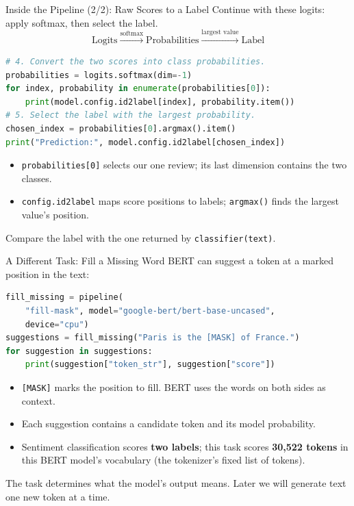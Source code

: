 \documentclass[aspectratio=169]{beamer}
\begin{document}
\begin{frame}[fragile]{Inside the Pipeline (2/2): Raw Scores to a Label}
  \small Continue with these logits: apply softmax, then select the label.
  \[
    \text{Logits}\xrightarrow{\text{softmax}}\text{Probabilities}
    \xrightarrow{\text{largest value}}\text{Label}
  \]
  \begin{lstlisting}[language=Python]
# 4. Convert the two scores into class probabilities.
probabilities = logits.softmax(dim=-1)
for index, probability in enumerate(probabilities[0]):
    print(model.config.id2label[index], probability.item())
# 5. Select the label with the largest probability.
chosen_index = probabilities[0].argmax().item()
print("Prediction:", model.config.id2label[chosen_index])
  \end{lstlisting}
  \begin{itemize}
    \item \texttt{probabilities[0]} selects our one review; its last dimension contains the two classes.
    \item \texttt{config.id2label} maps score positions to labels; \texttt{argmax()} finds the largest value's position.
  \end{itemize}
  \small Compare the label with the one returned by \texttt{classifier(text)}.
\end{frame}

\begin{frame}[fragile]{A Different Task: Fill a Missing Word}
  \small BERT can suggest a token at a marked position in the text:
  \begin{lstlisting}[language=Python]
fill_missing = pipeline(
    "fill-mask", model="google-bert/bert-base-uncased",
    device="cpu")
suggestions = fill_missing("Paris is the [MASK] of France.")
for suggestion in suggestions:
    print(suggestion["token_str"], suggestion["score"])
  \end{lstlisting}
  \begin{itemize}
    \item \texttt{[MASK]} marks the position to fill. BERT uses the words on both sides as context.
    \item Each suggestion contains a candidate token and its model probability.
    \item Sentiment classification scores \textbf{two labels}; this task scores \textbf{30,522 tokens} in this BERT model's vocabulary (the tokenizer's fixed list of tokens).
  \end{itemize}
  \small The task determines what the model's output means. Later we will generate text one new token at a time.
\end{frame}
\end{document}
